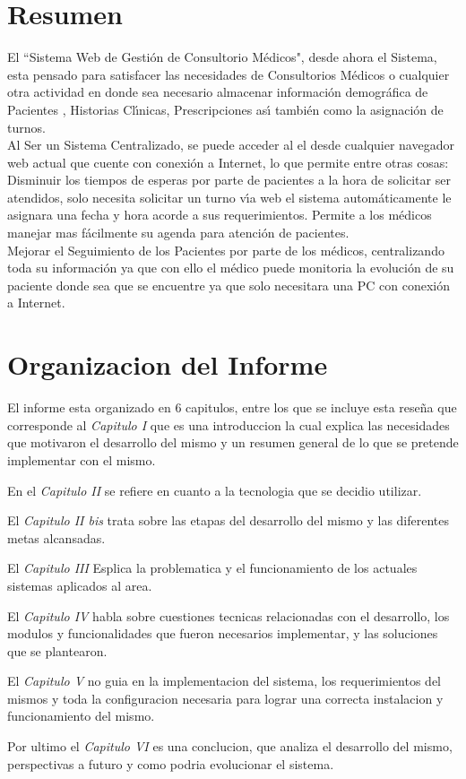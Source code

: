 \section{Resumen}

El ``Sistema Web de Gesti\'on de Consultorio M\'edicos", desde ahora el Sistema, esta pensado
para satisfacer las necesidades de Consultorios M\'edicos o cualquier otra actividad en donde
sea necesario almacenar informaci\'on demogr\'afica de Pacientes , Historias Cl\'{\i}nicas, 
Prescripciones as\'{\i} tambi\'en como la asignaci\'on de turnos.\\[0.1cm] 

Al Ser un Sistema Centralizado, se puede acceder al el desde cualquier navegador web actual 
que cuente con conexi\'on a Internet, lo que permite entre otras cosas:\\[0.1cm]

Disminuir los tiempos de esperas por parte de pacientes a la hora de solicitar ser atendidos, 
solo necesita solicitar un turno v\'{\i}a web el sistema autom\'aticamente le asignara una 
fecha y hora acorde a sus requerimientos. Permite a los m\'edicos manejar mas f\'acilmente su
agenda para atenci\'on de pacientes.\\[0.1cm]

Mejorar el Seguimiento de los Pacientes por parte de los m\'edicos, centralizando toda su 
informaci\'on ya que con ello el m\'edico puede monitoria la evoluci\'on de su paciente donde 
sea que se encuentre ya que solo necesitara una PC con conexi\'on a Internet.\\[0.1cm]


\section{Organizacion del Informe}

El informe esta organizado en 6 capitulos, entre los que se incluye esta reseña
que corresponde al \textit{Capitulo I} que es una introduccion la cual explica las necesidades 
que motivaron el desarrollo del mismo y un resumen general de lo que se pretende implementar 
con el mismo. 

En el \textit{Capitulo II} se refiere en cuanto a la tecnologia que 
se decidio utilizar. 

El \textit{Capitulo II bis} trata sobre las etapas del desarrollo del mismo y 
las diferentes metas alcansadas.

El \textit{Capitulo III} Esplica la problematica y el funcionamiento
de los actuales sistemas aplicados al area. 

El \textit{Capitulo IV} habla sobre cuestiones
tecnicas relacionadas con el desarrollo, los modulos y funcionalidades que fueron necesarios
implementar, y las soluciones que se plantearon.

El \textit{Capitulo V} no guia en la implementacion del sistema, los requerimientos del 
mismos y toda la configuracion necesaria para lograr una correcta instalacion y 
funcionamiento del mismo.

Por ultimo el \textit{Capitulo VI} es una conclucion, que analiza el desarrollo del mismo, 
perspectivas a futuro y como podria evolucionar el sistema.
